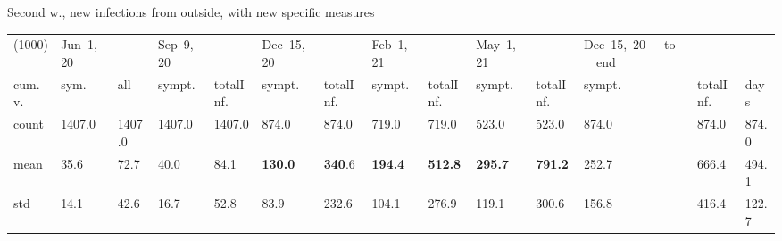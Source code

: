 \documentclass[8pt]{beamer}
\begin{document}
\begin{frame}{Second w., new infections from outside, with new specific measures}
\begin{table}[H]
\center
\tiny
\begin{tabular}{p{0.4cm}p{0.3cm}p{0.3cm}p{0.3cm}p{0.3cm}p{0.3cm}p{0.3cm}p{0.3cm}p{0.3cm}p{0.3cm}p{0.3cm}p{0.3cm}p{0.3cm}p{0.4cm}}
\toprule
(1000) &  Jun~1,~20 & &  Sep~9,~20 & & Dec~15,~20 & & Feb~1,~21 & & May~1,~21 & & Dec~15,~20~~~to~~~end   \\
cum.~v. &  sym. &  all &  sympt. &  totalInf. &  sympt. &  totalInf. &  sympt. &  totalInf. &  sympt. &  totalInf. &  sympt. &  totalInf.  & days\\
\midrule
count &   1407.0 &                     1407.0 &   1407.0 &                     1407.0 &    874.0 &                      874.0 &    719.0 &                      719.0 &    523.0 &                      523.0 &              874.0 &                   874.0 &  874.0 \\
mean  &     35.6 &                       72.7 &     40.0 &                       84.1 &    \textbf{130.0} &                      \textbf{340}.6 &    \textbf{194.4} &                      \textbf{512.8} &    \textbf{295.7} &                      \textbf{791.2} &               252.7 &                   666.4 &  494.1 \\
std   &     14.1 &                       42.6 &     16.7 &                       52.8 &     83.9 &                      232.6 &    104.1 &                      276.9 &    119.1 &                      300.6 &               156.8 &                   416.4 &  122.7 \\
\bottomrule
\end{tabular}

\label{selSpontWave2Contr2Tab}
\end{table}


\end{frame}
\end{document}
